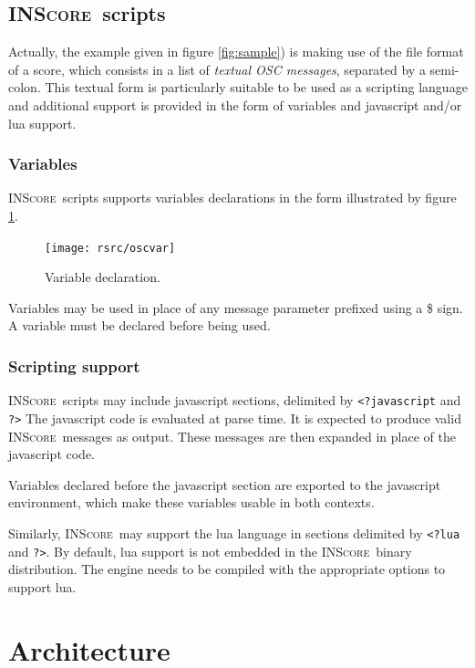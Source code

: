\documentclass[11pt,letterpaper]{article}
\newcommand{\inscore}		{\textsc{\small INScore}}
\begin{document}
\subsection{\inscore\ scripts}
Actually, the example given in figure \ref{fig:sample}) is making use of the file format of a score, which consists in a list of \emph{textual OSC messages}, separated by a semi-colon. This textual form is particularly suitable to be used as a scripting language and additional support is provided in the form of variables and javascript and/or lua support.

\subsubsection{Variables}

\inscore\ scripts supports variables declarations in the form illustrated by figure \ref{fig:var}. 
\begin{figure}[htbp]
\centerline{
	\texttt{[image: rsrc/oscvar]}}
\caption{Variable declaration.}
\label{fig:var}
\end{figure}
Variables may be used in place of any message parameter prefixed using a \$ sign. A variable must be declared before being used.

\subsubsection{Scripting support}
\inscore\ scripts may include javascript sections, delimited by \texttt{<?javascript} and \texttt{?>}
The javascript code is evaluated at parse time. It is expected to produce valid \inscore\ messages as output.
These messages are then expanded in place of the javascript code.

Variables declared before the javascript section are exported to the javascript environment, which make these variables usable in both contexts.

Similarly, \inscore\ may support the lua language in sections delimited by \texttt{<?lua} and \texttt{?>}. By default, lua support is not embedded in the \inscore\ binary distribution. The engine needs to be compiled with the appropriate options to support lua.


\section{Architecture}
\end{document}
